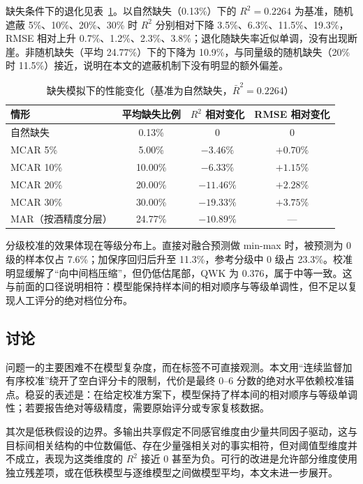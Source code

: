 ﻿\documentclass[UTF8,a4paper,zihao=-4]{ctexart}
\numberwithin{figure}{section}
\numberwithin{table}{section}
\numberwithin{equation}{section}
\begin{document}
缺失条件下的退化见表~\ref{tab:q1-missing}。以自然缺失（0.13\%）下的 $R^2=0.2264$ 为基准，随机遮蔽 5\%、10\%、20\%、30\% 时 $R^2$ 分别相对下降 3.5\%、6.3\%、11.5\%、19.3\%，RMSE 相对上升 0.7\%、1.2\%、2.3\%、3.8\%；退化随缺失率近似单调，没有出现断崖。非随机缺失（平均 24.77\%）下的下降为 10.9\%，与同量级的随机缺失（20\% 时 11.5\%）接近，说明在本文的遮蔽机制下没有明显的额外偏差。

\begin{table}[H]
  \centering
  \caption{缺失模拟下的性能变化（基准为自然缺失，$\bar R^2=0.2264$）}
  \label{tab:q1-missing}
  \small
  \begin{tabularx}{\textwidth}{@{}X c c c@{}}
    \toprule
    情形 & 平均缺失比例 & $R^2$ 相对变化 & RMSE 相对变化 \\
    \midrule
    自然缺失 & 0.13\% & 0 & 0 \\
    MCAR 5\% & 5.00\% & $-3.46\%$ & $+0.70\%$ \\
    MCAR 10\% & 10.00\% & $-6.33\%$ & $+1.15\%$ \\
    MCAR 20\% & 20.00\% & $-11.46\%$ & $+2.28\%$ \\
    MCAR 30\% & 30.00\% & $-19.33\%$ & $+3.75\%$ \\
    MAR（按酒精度分层） & 24.77\% & $-10.89\%$ & — \\
    \bottomrule
  \end{tabularx}
\end{table}

分级校准的效果体现在等级分布上。直接对融合预测做 min-max 时，被预测为 0 级的样本仅占 7.6\%；加保序回归后升至 11.3\%，参考分级中 0 级占 23.3\%。校准明显缓解了“向中间档压缩”，但仍低估尾部，QWK 为 0.376，属于中等一致。这与前面的口径说明相符：模型能保持样本间的相对顺序与等级单调性，但不足以复现人工评分的绝对档位分布。

\subsection{讨论}

问题一的主要困难不在模型复杂度，而在标签不可直接观测。本文用“连续监督加有序校准”绕开了空白评分卡的限制，代价是最终 0--6 分数的绝对水平依赖校准锚点。稳妥的表述是：在给定校准方案下，模型保持了样本间的相对顺序与等级单调性；若要报告绝对等级精度，需要原始评分或专家复核数据。

其次是低秩假设的边界。多输出共享假定不同感官维度由少量共同因子驱动，这与目标间相关结构的中位数偏低、存在少量强相关对的事实相符，但对阈值型维度并不成立，表现为这类维度的 $R^2$ 接近 0 甚至为负。可行的改进是允许部分维度使用独立残差项，或在低秩模型与逐维模型之间做模型平均，本文未进一步展开。
\end{document}
